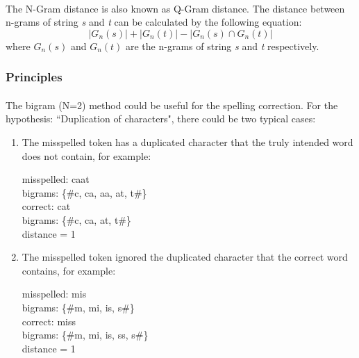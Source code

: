 \documentclass[11pt]{article}
\begin{document}
\paragraph{} The N-Gram distance is also known as Q-Gram distance. The distance between n-grams of string \textit{s} and \textit{t} can be calculated by the following equation:
$$
	|G_n(s)|+ |G_n(t)| - |G_n(s) \cap G_n(t)|
$$
where $G_n(s)$ and $G_n(t)$ are the n-grams of string \textit{s} and \textit{t} respectively.

\subsubsection{Principles}

\paragraph{} The bigram (N=2) method could be useful for the spelling correction. For the hypothesis: ``Duplication of characters", there could be two typical cases:

\begin{enumerate}
\item
The misspelled token has a duplicated character that the truly intended word does not contain, for example:

\begin{center}
\parbox{6cm}{
   misspelled: caat \\
   bigrams: \{\#c, ca, aa, at, t\#\} \\
   correct: cat \\
   bigrams: \{\#c, ca, at, t\#\} \\
   distance = 1 \\
}
\end{center}

\item
The misspelled token ignored the duplicated character that the correct word contains, for example:

\begin{center}
\parbox{6cm}{
   misspelled: mis \\
   bigrams: \{\#m, mi, is, s\#\} \\
   correct: miss \\
   bigrams: \{\#m, mi, is, ss, s\#\} \\
   distance = 1 \\
}
\end{center}

\end{enumerate}
\end{document}
